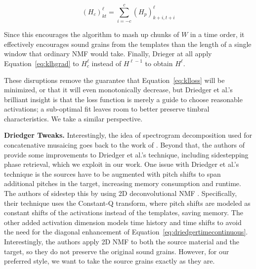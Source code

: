 \documentclass{article}
\begin{document}
\begin{equation}
    \label{eq:driedgertimecontinuous}
    (H_c)_{kt}^{\ell} = \sum_{i=-c}^c (H_p)^{\ell}_{k+i, t+i}
\end{equation}

Since this encourages the algorithm to mash up chunks of $W$ in a time order, it effectively encourages sound grains from the templates than the length of a single window that ordinary NMF would take.  Finally, Drieger at all apply Equation~\ref{eq:klhgrad} to $H_c^{\ell}$ instead of $H^{\ell-1}$ to obtain $H^{\ell}$.

These disruptions remove the guarantee that Equation~\ref{eq:klloss} will be minimized, or that it will even monotonically decrease, but Driedger et al.'s brilliant insight is that the loss function is merely a guide to choose reasonable activations; a sub-optimal fit leaves room to better preserve timbral characteristics.  We take a similar perspective.

\textbf{Driedger Tweaks.} Interestingly, the idea of spectrogram decomposition used for concatenative musaicing goes back to the work of \cite{burred2013cross}.  Beyond that, the authors of \cite{buch2017nichtnegativematrixfaktorisierungnutzendesklangsynthesensystem} provide some improvements to Driedger et al.'s technique, including sidestepping phase retrieval, which we exploit in our work. One issue with Driedger et al.'s technique is the sources have to be augmented with pitch shifts to span additional pitches in the target, increasing memory consumption and runtime.  The authors of \cite{foroughmand2017multi, aarabi2018music} sidestep this by using 2D deconvolutional NMF \cite{schmidt2006nonnegative}.  Specifically, their technique uses the Constant-Q transform, where pitch shifts are modeled as constant shifts of the activations instead of the templates, saving memory.  The other added activation dimension models time history and time shifts to avoid the need for the diagonal enhancement of Equation~\ref{eq:driedgertimecontinuous}.  Interestingly, the authors apply 2D NMF to both the source material and the target, so they do not preserve the original sound grains.  However, for our preferred style, we want to take the source grains exactly as they are.
\end{document}
